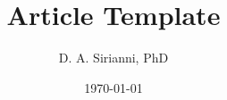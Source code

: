 




\title{Article Template}
\author{D. A. Sirianni, PhD}
\date{\today}

\maketitle

\blindtext[5]




